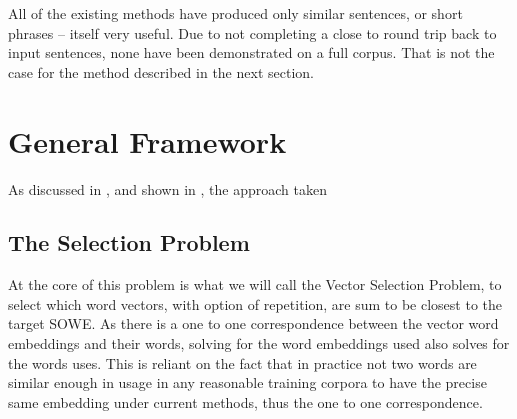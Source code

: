 \documentclass[11pt]{article}
\numberwithin{equation}{section}
\numberwithin{figure}{section}
\theoremstyle{plain}
\theoremstyle{definition}
\begin{document}
All of the existing methods have produced only similar sentences, or short phrases -- itself very useful. Due to not completing a close to round trip back to input sentences, none have been demonstrated on a full corpus. That is not the case for the method described in the next section.

\section{General Framework}\label{framework}
As discussed in , and shown in , the approach taken 

\subsection{The Selection Problem}

At the core of this problem is what we will call the Vector Selection Problem, to select which word vectors, with option of repetition, are sum to be closest to the target SOWE.
As there is a one to one correspondence between the vector word embeddings and their words, solving for the word embeddings used also solves for the words uses. This is reliant on the fact that in practice not two words are similar enough in usage in any reasonable training corpora to have the precise same embedding under current methods, thus the one to one correspondence.
\end{document}
